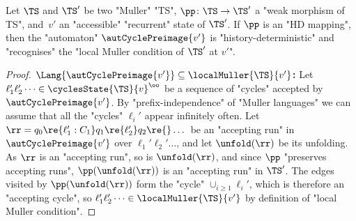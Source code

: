 \documentclass{theoretics}
\begin{document}
\begin{lemma}\label{lemma-acd:automaton-precycles}
	Let $\TS$ and $\TS'$ be two "Muller" "TS", $\pp \colon \TS \to \TS'$ a "weak morphism of TS", and~$v'$ an "accessible" "recurrent" state of $\TS'$.
	If $\pp$ is an "HD mapping", then the "automaton"  $\autCyclePreimage{v'}$ is "history-deterministic" and "recognises" the "local Muller condition of $\TS'$ at $v'$".
\end{lemma}
\begin{proof}
	\textbf{$\Lang{\autCyclePreimage{v'}} \subseteq \localMuller{\TS}{v'}$:} Let $\ell_1'\ell_2'\dots\in \cyclesState{\TS}{v}^\oo$ be a sequence of "cycles" accepted by $\autCyclePreimage{v'}$. By "prefix-independence" of "Muller languages" we can assume that all the "cycles" $\ell_i'$ appear infinitely often.
	 Let $\rr = q_0\re{\ell_1':C_1}q_1\re{\ell_2'}q_2\re{} \dots$ be an "accepting run" in $\autCyclePreimage{v'}$ over $\ell_1'\ell_2'\dots$, and let $\unfold(\rr)$ be its unfolding. As $\rr$ is an "accepting run", so is $\unfold(\rr)$, and since $\pp$ "preserves accepting runs", $\pp(\unfold(\rr))$ is an "accepting run" in $\TS'$. The edges visited by $\pp(\unfold(\rr))$ form the "cycle" $\cup_{i\geq 1} \ell_i'$, which is therefore an "accepting cycle", so $\ell_1'\ell_2'\dots\in \localMuller{\TS}{v'}$ by definition of "local Muller condition".
	

\end{proof}
\end{document}
